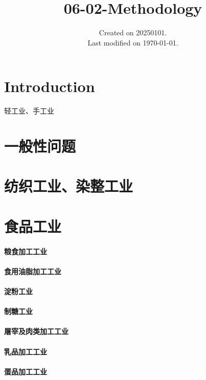 \documentclass[UTF8]{../../ApplicationUniverse}
\begin{document}
\title{06-02-Methodology}
\date{Created on 20250101.\\   Last modified on \today.}
\maketitle
\tableofcontents


\chapter{Introduction}

轻工业、手工业

\chapter{一般性问题}




\chapter{纺织工业、染整工业}




\chapter{食品工业}
\subsubsection{粮食加工工业}
\subsubsection{食用油脂加工工业}
\subsubsection{淀粉工业}
\subsubsection{制糖工业}
\subsubsection{屠宰及肉类加工工业}
\subsubsection{乳品加工工业}
\subsubsection{蛋品加工工业}
\end{document}
